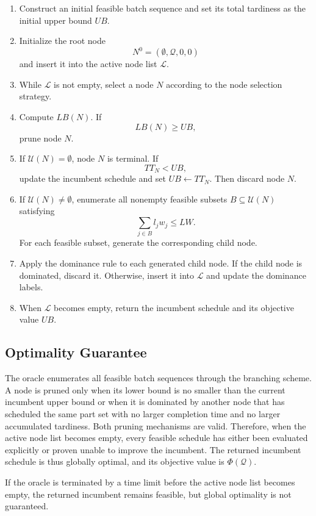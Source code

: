 \documentclass[review,3p,times,authoryear]{elsarticle}
\begin{document}
\begin{enumerate}
	\item Construct an initial feasible batch sequence and set its total
	tardiness as the initial upper bound $UB$.
	
	\item Initialize the root node
	\[
	N^0=(\emptyset,\mathcal{Q},0,0)
	\]
	and insert it into the active node list $\mathcal{L}$.
	
	\item While $\mathcal{L}$ is not empty, select a node $N$ according to
	the node selection strategy.
	
	\item Compute $LB(N)$. If
	\[
	LB(N)\ge UB,
	\]
	prune node $N$.
	
	\item If $\mathcal{U}(N)=\emptyset$, node $N$ is terminal. If
	\[
	TT_N<UB,
	\]
	update the incumbent schedule and set $UB\leftarrow TT_N$. Then discard
	node $N$.
	
	\item If $\mathcal{U}(N)\neq\emptyset$, enumerate all nonempty feasible
	subsets $B\subseteq\mathcal{U}(N)$ satisfying
	\[
	\sum_{j\in B}l_jw_j\le LW.
	\]
	For each feasible subset, generate the corresponding child node.
	
	\item Apply the dominance rule to each generated child node. If the
	child node is dominated, discard it. Otherwise, insert it into
	$\mathcal{L}$ and update the dominance labels.
	
	\item When $\mathcal{L}$ becomes empty, return the incumbent schedule
	and its objective value $UB$.
\end{enumerate}

\subsection{Optimality Guarantee}

The oracle enumerates all feasible batch sequences through the branching
scheme. A node is pruned only when its lower bound is no smaller than the
current incumbent upper bound or when it is dominated by another node that
has scheduled the same part set with no larger completion time and no larger
accumulated tardiness. Both pruning mechanisms are valid. Therefore, when
the active node list becomes empty, every feasible schedule has either been
evaluated explicitly or proven unable to improve the incumbent. The returned
incumbent schedule is thus globally optimal, and its objective value is
$\Phi(\mathcal{Q})$.

If the oracle is terminated by a time limit before the active node list
becomes empty, the returned incumbent remains feasible, but global
optimality is not guaranteed.
\end{document}
